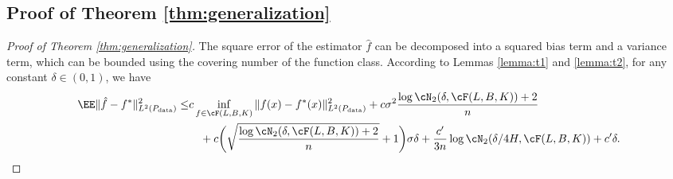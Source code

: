 \subsection{Proof of Theorem \ref{thm:generalization}}
\begin{proof}[Proof of Theorem \ref{thm:generalization}]
The square error of the estimator $\hat{f}$ can be decomposed into a squared bias term and a variance term, which can be bounded using the covering number of the function class. According to Lemmas \ref{lemma:t1} and \ref{lemma:t2}, for any constant $\delta\in(0,1)$, we have
\begin{equation}\label{eq: l2-bound}
    \begin{split}
        \EE \| \hat{f} - f^*\|^2_{L^2(P_{\rm data})} \leq& c \inf_{f \in \cF( L, B, K)} \norm{ f(x) - f^*(x)}^2_{L^2(P_{\rm data})}  + c \sigma^2 \frac{\log \cN_2(\delta, \cF( L, B, K)) + 2}{n} \\
        &\quad +  c\bigg(   \sqrt{\frac{\log \cN_2(\delta, \cF(L, B, K)) + 2}{n}} + 1 \bigg)\sigma \delta + \frac{c'}{3n} \log \cN_2(\delta/4H, \cF(L, B, K))+ c'\delta.
    \end{split}
\end{equation}


\end{proof}
